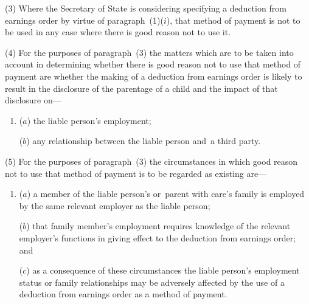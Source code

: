 \documentclass[12pt,a4paper]{article}
\begin{document}
(3) Where the Secretary of State is considering specifying a deduction from earnings order by virtue of paragraph~(1)($i$), that method of payment is not to be used in any case where there is good reason not to use it.

(4) For the purposes of paragraph~(3) the matters which are to be taken into account in determining whether there is good reason not to use that method of payment are whether the making of a deduction from earnings order is likely to result in the disclosure of the parentage of a child and the impact of that disclosure on—
\begin{enumerate}\item[]
($a$) the liable person’s employment;

($b$) any relationship between the liable person and~a third party.
\end{enumerate}

(5) For the purposes of paragraph~(3) the circumstances in which good reason not to use that method of payment is to be regarded as existing are—
\begin{enumerate}\item[]
($a$) a member of the liable person’s or~parent with care’s family is employed by the same relevant employer as the liable person;

($b$) that family member’s employment requires knowledge of the relevant employer’s functions in giving effect to the deduction from earnings order; and

($c$) as a consequence of these circumstances the liable person’s employment status or family relationships may be adversely affected by the use of a deduction from earnings order as a method of payment.
\end{enumerate}
\end{document}
